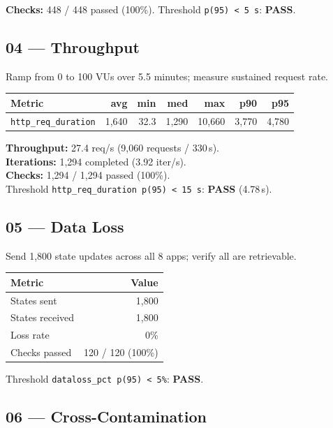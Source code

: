 \documentclass[11pt,a4paper]{article}
\newcommand{\pass}{\textcolor{pass}{\textbf{PASS}}}
\begin{document}
\medskip
\noindent\textbf{Checks:} 448 / 448 passed (100\%).
Threshold \texttt{p(95) < 5\,s}: \pass.

\subsection{04 — Throughput}

Ramp from 0 to 100 VUs over 5.5 minutes; measure sustained request rate.

\begin{tabular}{@{}lrrrrrr@{}}
\toprule
\textbf{Metric} & \textbf{avg} & \textbf{min} & \textbf{med} & \textbf{max} & \textbf{p90} & \textbf{p95} \\
\midrule
\texttt{http\_req\_duration} & 1,640 & 32.3 & 1,290 & 10,660 & 3,770 & 4,780 \\
\bottomrule
\end{tabular}

\medskip
\noindent
\textbf{Throughput:} 27.4 req/s (9,060 requests / 330\,s). \\
\textbf{Iterations:} 1,294 completed (3.92 iter/s). \\
\textbf{Checks:} 1,294 / 1,294 passed (100\%). \\
Threshold \texttt{http\_req\_duration p(95) < 15\,s}: \pass{} (4.78\,s).

\subsection{05 — Data Loss}

Send 1,800 state updates across all 8 apps; verify all are retrievable.

\begin{tabular}{@{}lr@{}}
\toprule
\textbf{Metric} & \textbf{Value} \\
\midrule
States sent     & 1,800 \\
States received & 1,800 \\
Loss rate       & 0\% \\
Checks passed   & 120 / 120 (100\%) \\
\bottomrule
\end{tabular}

\medskip
\noindent Threshold \texttt{dataloss\_pct p(95) < 5\%}: \pass.

\subsection{06 — Cross-Contamination}
\end{document}
